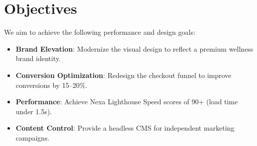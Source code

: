 \section{Objectives}
We aim to achieve the following performance and design goals:
\begin{itemize}
    \item \textbf{Brand Elevation}: Modernize the visual design to reflect a premium wellness brand identity.
    \item \textbf{Conversion Optimization}: Redesign the checkout funnel to improve conversions by 15--20\%.
    \item \textbf{Performance}: Achieve Nexa Lighthouse Speed scores of 90+ (load time under 1.5s).
    \item \textbf{Content Control}: Provide a headless CMS for independent marketing campaigns.
\end{itemize}

\vspace{0.05in}

